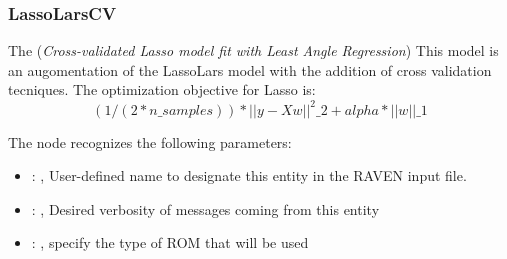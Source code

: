 \subsubsection{LassoLarsCV}
  The  (\textit{Cross-validated Lasso model fit with Least Angle Regression})
  This model is an augomentation of the LassoLars model with the addition of
  cross validation tecniques.                         The optimization objective for Lasso is:
  \begin{equation}                          (1 / (2 * n\_samples)) * ||y - Xw||^2\_2 + alpha *
  ||w||\_1                         \end{equation}

  The  node recognizes the following parameters:
    \begin{itemize}
      \item {}: , 
        User-defined name to designate this entity in the RAVEN input file.
      \item {}: , 
        Desired verbosity of messages coming from this entity
      \item {}: , 
        specify the type of ROM that will be used
  \end{itemize}

